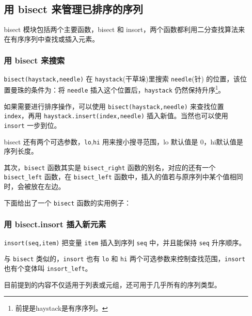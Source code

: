 \subsection{用 bisect 来管理已排序的序列}

bisect 模块包括两个主要函数，bisect 和 insort，两个函数都利用二分查找算法来在有序序列中查找或插入元素。

\subsubsection{用 bisect 来搜索}

\texttt{bisect(haystack,needle)} 在 \texttt{haystack}(干草垛)里搜索 \texttt{needle}(针) 的位置，该位置曼珠的条件为：将 \texttt{needle} 插入这个位置后，\texttt{haystack} 仍然保持升序\footnote{前提是haystack是有序序列。}。

如果需要进行排序操作，可以使用 \texttt{bisect(haystack,needle)} 来查找位置 \texttt{index}，再用 \texttt{haystack.insert(index,needle)} 插入新值。当然也可以使用 \texttt{insort} 一步到位。



bisect 还有两个可选参数，\texttt{lo},\texttt{hi} 用来搜小搜寻范围，lo 默认值是 0，hi默认值是序列长度。

其次，\texttt{bisect} 函数其实是 \texttt{bisect\_right} 函数的别名，对应的还有一个 \texttt{bisect\_left} 函数，在 \texttt{bisect\_left} 函数中，插入的值若与原序列中某个值相同时，会被放在左边。

下面给出了一个 \texttt{bisect} 函数的实用例子：



\subsubsection{用 bisect.insort 插入新元素}

\texttt{insort(seq,item)} 把变量 \texttt{item} 插入到序列 \texttt{seq} 中，并且能保持 \texttt{seq} 升序顺序。



与 \texttt{bisect} 类似的，\texttt{insort} 也有 \texttt{lo} 和 \texttt{hi} 两个可选参数来控制查找范围，\texttt{insort} 也有个变体叫 \texttt{insort\_left}。

目前提到的内容不仅适用于列表或元组，还可用于几乎所有的序列类型。

